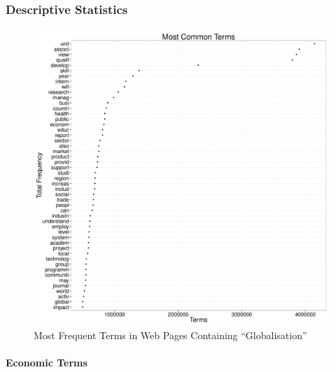 \documentclass[11pt,article,oneside]{memoir}
\makeatletter
\def\maxwidth{\ifdim\Gin@nat@width>\linewidth\linewidth
\else\Gin@nat@width\fi}
\let\Oldincludegraphics\includegraphics
\renewcommand{\includegraphics}[1]{\Oldincludegraphics[width=\maxwidth]{#1}}
\makeatother
\begin{document}
\subsubsection{Descriptive Statistics}\label{descriptive-statistics}

\begin{figure}[htbp]
\centering
\includegraphics{figure/globalisation_frequency_plot.pdf}
\caption{Most Frequent Terms in Web Pages Containing ``Globalisation''}
\end{figure}

\pagebreak

\paragraph{Economic Terms}\label{economic-terms}
\end{document}
